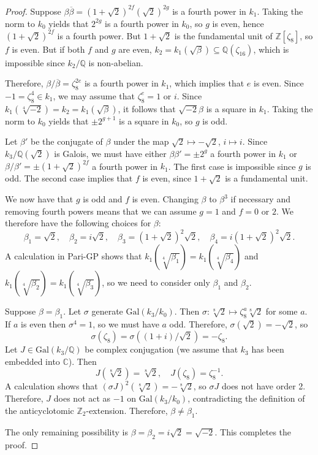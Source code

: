 \documentclass{amsart}
\begin{document}
\begin{proof}
Suppose $\beta\overline{\beta}= (1+\sqrt{2})^{2f}(\sqrt{2})^{2g}$ is a fourth power in $k_1$. 
Taking the norm to $k_0$ yields that $2^{2g}$ is a fourth power in $k_0$, so $g$ is even, hence $(1+\sqrt{2})^{2f}$
is a fourth power.
But $1+\sqrt{2}$ is the fundamental unit of $\mathbb Z[\zeta_8]$, so $f$ is even.
But if both $f$ and $g$ are even, $k_2=k_1(\sqrt{\beta})\subseteq \mathbb Q(\zeta_{16})$, which is impossible
since $k_2/\mathbb Q$ is non-abelian. 

Therefore, $\beta/\overline{\beta} = \zeta_8^{2e}$ is a fourth power in $k_1$, which implies that $e$ is even.
Since $-1=\zeta_8^4\in k_1$, we may assume that $\zeta_8^e= 1$ or $i$.
Since $k_1(\sqrt[4]{-2})= k_2=k_1(\sqrt{\beta})$, it follows that $\sqrt{-2}\beta$ is a square in $k_1$.
Taking the norm to $k_0$ yields that $\pm 2^{g+1}$ is a square in $k_0$, so $g$ is odd. 

Let $\beta'$ be the conjugate of $\beta$ under the map $\sqrt{2}\mapsto -\sqrt{2}$, $i\mapsto i$. 
Since $k_3/\mathbb Q(\sqrt{2})$ is Galois, we must have either $\beta\beta'= \pm 2^g$ a fourth power in $k_1$ or 
$\beta/\beta'=\pm (1+\sqrt{2})^{2f}$ a fourth power in $k_1$. The first case is impossible since $g$ is odd.
The second case implies that $f$ is even, since $1+\sqrt{2}$ is a fundamental unit.

We now have that $g$ is odd and $f$ is even. Changing $\beta$
to $\beta^3$ if necessary and removing fourth powers means that we can assume $g=1$ and $f=0$ or $2$.
We therefore have the following choices for $\beta$:
$$
\beta_1 = \sqrt{2}, \quad \beta_2 = i\sqrt{2}, \quad \beta_3 = (1+\sqrt{2})^2\sqrt{2}, 
\quad \beta_4 = i(1+\sqrt{2})^2\sqrt{2}.
$$
A calculation in Pari-GP shows that $k_1(\sqrt[4]{\beta_1})=k_1(\sqrt[4]{\beta_4})$ and
 $k_1(\sqrt[4]{\beta_2})=k_1(\sqrt[4]{\beta_3})$, so we need to consider only $\beta_1$ and $\beta_2$.

Suppose $\beta = \beta_1$.   
Let $\sigma$ generate $\text{Gal}(k_3/k_0)$.  
Then $\sigma: \sqrt[8]{2}\mapsto \zeta_8^a\sqrt[8]{2}$ for some $a$. If $a$ is even then $\sigma^4=1$, so we must have $a$ odd. Therefore,
$\sigma(\sqrt{2}) = -\sqrt{2}$, so 
$$
\sigma(\zeta_8) = \sigma((1+i)/\sqrt{2}) = -\zeta_8.
$$
Let $J\in \text{Gal}(k_3/\mathbb Q)$ be complex conjugation 
(we assume that $k_3$ has been embedded into $\mathbb C$).
Then 
$$
J(\sqrt[8]{2}) = \sqrt[8]{2}, \quad J(\zeta_8)=\zeta_8^{-1}.
$$
A calculation shows that $(\sigma J)^2(\sqrt[8]{2}) = -\sqrt[8]{2}$, so $\sigma J$ does not have order 2.
Therefore, $J$ does not act as $-1$ on $\text{Gal}(k_3/k_0)$, contradicting the definition of the anticyclotomic
$\mathbb Z_2$-extension. Therefore, $\beta\ne \beta_1$.

The only remaining possibility is $\beta=\beta_2 = i\sqrt{2}= \sqrt{-2}$. This completes the proof. \end{proof}
\end{document}
